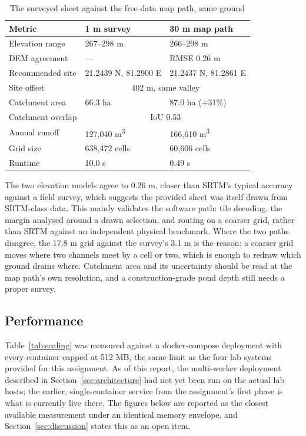 \documentclass[manuscript,screen,review]{acmart}
\begin{document}
\begin{table}[h]
  \caption{The surveyed sheet against the free-data map path, same ground}
  \label{tab:validation}
  \begin{tabular}{p{2.6cm}p{2.1cm}p{2.5cm}}
    \toprule
    Metric & 1 m survey & 30 m map path \\
    \midrule
    Elevation range & 267--298 m & 266--298 m \\
    DEM agreement & --- & RMSE 0.26 m \\
    Recommended site & 21.2439 N, 81.2900 E & 21.2437 N, 81.2861 E \\
    Site offset & \multicolumn{2}{c}{402 m, same valley} \\
    Catchment area & 66.3 ha & 87.0 ha (+31\%) \\
    Catchment overlap & \multicolumn{2}{c}{IoU 0.53} \\
    Annual runoff & 127{,}040 m\textsuperscript{3} & 166{,}610 m\textsuperscript{3} \\
    Grid size & 638{,}472 cells & 60{,}606 cells \\
    Runtime & 10.0 s & 0.49 s \\
    \bottomrule
  \end{tabular}
\end{table}

The two elevation models agree to 0.26 m, closer than SRTM's typical accuracy against a
field survey, which suggests the provided sheet was itself drawn from SRTM-class data.
This mainly validates the software path: tile decoding, the margin analysed around a
drawn selection, and routing on a coarser grid, rather than SRTM against an independent
physical benchmark. Where the two paths disagree, the 17.8 m grid against the survey's
3.1 m is the reason: a coarser grid moves where two channels meet by a cell or two,
which is enough to redraw which ground drains where. Catchment area and its uncertainty
should be read at the map path's own resolution, and a construction-grade pond depth
still needs a proper survey.

\subsection{Performance}
Table~\ref{tab:scaling} was measured against a docker-compose deployment with every
container capped at 512 MB, the same limit as the four lab systems provided for this
assignment. As of this report, the multi-worker deployment described in
Section~\ref{sec:architecture} had not yet been run on the actual lab hosts; the
earlier, single-container service from the assignment's first phase is what is
currently live there. The figures below are reported as the closest available
measurement under an identical memory envelope, and Section~\ref{sec:discussion} states
this as an open item.
\end{document}
